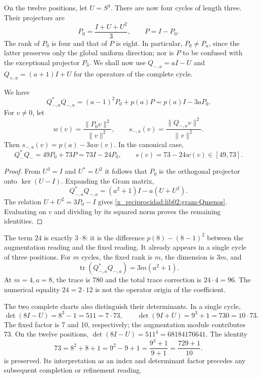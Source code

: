 On the twelve positions, let \(U=S^4\). There are now four cycles of length three. Their projectors are
\[
 P_0=\frac{I+U+U^2}{3},\qquad P=I-P_0.
\]
The rank of \(P_0\) is four and that of \(P\) is eight. In particular, \(P_0\ne P_u\), since the latter preserves only the global uniform direction; nor is \(P\) to be confused with the exceptional projector \(P_3\). We shall now use \(Q_{-,a}=aI-U\) and \(Q_{+,a}=(a+1)I+U\) for the operators of the complete cycle.

\begin{theorem}
\label{x_reciprocidad:lib02:gram-ternario}
We have
\begin{equation}
 Q_{-,a}^*Q_{-,a}
 =(a-1)^2P_0+p(a)P=p(a)I-3aP_0.
 \label{x_reciprocidad:lib02:gram-Qmenos}
\end{equation}
For \(v\ne0\), let
\[
 w(v)=\frac{\|P_0v\|^2}{\|v\|^2},\qquad
 s_{-,a}(v)=\frac{\|Q_{-,a}v\|^2}{\|v\|^2}.
\]
Then \(s_{-,a}(v)=p(a)-3aw(v)\). In the canonical case,
\begin{equation}
 Q_-^*Q_-=49P_0+73P=73I-24P_0,
 \qquad s(v)=73-24w(v)\in[49,73].
 \label{x_reciprocidad:lib02:73-24w}
\end{equation}
\end{theorem}
\begin{proof}
From \(U^3=I\) and \(U^*=U^2\) it follows that \(P_0\) is the orthogonal projector onto \(\ker(U-I)\). Expanding the Gram matrix,
\[
 Q_{-,a}^*Q_{-,a}=(a^2+1)I-a(U+U^2).
\]
The relation \(U+U^2=3P_0-I\) gives \eqref{x_reciprocidad:lib02:gram-Qmenos}. Evaluating on \(v\) and dividing by its squared norm proves the remaining identities.
\end{proof}

The term \(24\) is exactly \(3\cdot8\): it is the difference \(p(8)-(8-1)^2\) between the augmentation reading and the fixed reading. It already appears in a single cycle of three positions. For \(m\) cycles, the fixed rank is \(m\), the dimension is \(3m\), and
\[
 \operatorname{tr}(Q_{-,a}^*Q_{-,a})=3m(a^2+1).
\]
At \(m=4,a=8\), the trace is 780 and the total trace correction is \(24\cdot4=96\). The numerical equality \(24=2\cdot12\) is not the operator origin of the coefficient.

The two complete charts also distinguish their determinants. In a
single cycle,
\[
 \det(8I-U)=8^3-1=511=7\cdot73,
 \qquad
 \det(9I+U)=9^3+1=730=10\cdot73.
\]
The fixed factor is 7 and 10, respectively; the augmentation module contributes 73. On the twelve positions, \(\det(8I-U)=511^4=68184176641\). The identity
\begin{equation}
 73=8^2+8+1=9^2-9+1=\frac{9^3+1}{9+1}
 =\frac{729+1}{10}.
 \label{x_reciprocidad:lib02:completacion73}
\end{equation}
is preserved. Its interpretation as an index and determinant factor precedes any subsequent completion or refinement reading.


